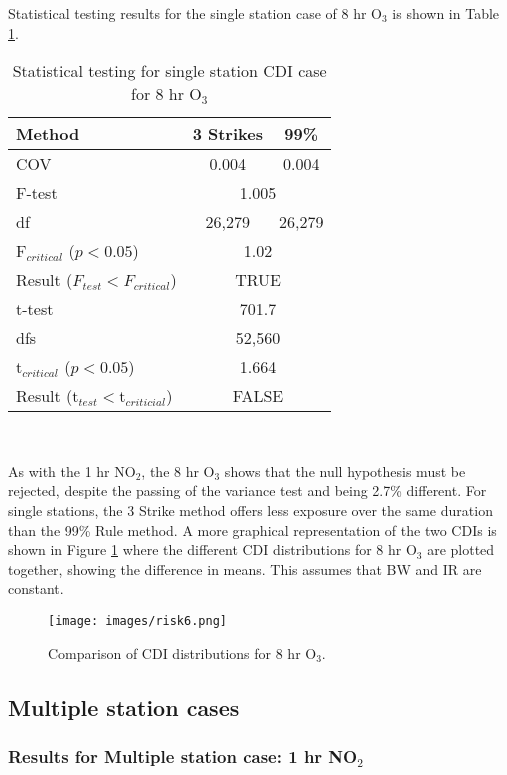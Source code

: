 Statistical testing results for the single station case of 8 hr O$_{3}$ is shown in Table \ref{tb9:test1hrO3}.
%
\begin{table}[H]
\centering
\caption{Statistical testing for single station CDI case for 8 hr O$_{3}$}
\label{tb9:test1hrO3}
\begin{tabular}{lcc}
\toprule
\textbf{Method} & \textbf{3 Strikes} & \textbf{99\%} \\ \midrule
COV & 0.004 & 0.004 \\
F-test & \multicolumn{2}{c}{1.005} \\
df & 26,279 & 26,279 \\
F$_{critical}$ ($p<0.05$) & \multicolumn{2}{c}{1.02} \\
Result ($F_{test} < F_{critical}$) & \multicolumn{2}{c}{TRUE} \\
t-test & \multicolumn{2}{c}{701.7} \\
dfs & \multicolumn{2}{c}{52,560} \\
t$_{critical}$ ($p<0.05$) & \multicolumn{2}{c}{1.664} \\
Result (t$_{test} < $t$_{criticial}$) & \multicolumn{2}{c}{FALSE} \\ \bottomrule
\end{tabular} \\
\end{table}
%
As with the 1 hr NO$_{2}$, the 8 hr O$_{3}$ shows that the null hypothesis must be rejected, despite the passing of the variance test and being 2.7\% different. For single stations, the 3 Strike method offers less exposure over the same duration than the 99\% Rule method. A more graphical representation of the two CDIs is shown in Figure \ref{fig6:CDIdistributions} where the different CDI distributions for 8 hr O$_{3}$ are plotted together, showing the difference in means. This assumes that BW and IR are constant.
%  
\begin{figure}
\texttt{[image: images/risk6.png]}  
\caption{Comparison of CDI distributions for 8 hr O$_{3}$.}
\label{fig6:CDIdistributions}
\end{figure}
%

\subsection{Multiple station cases}
\subsubsection{Results for Multiple station case: 1 hr NO$_{2}$}

